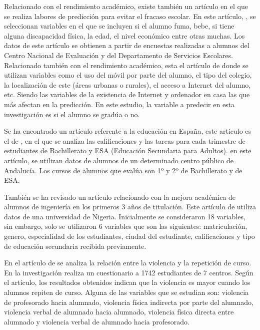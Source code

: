 Relacionado con el rendimiento académico, existe también un artículo en el que se realiza labores de predicción para evitar el fracaso escolar. En este artículo, \cite{vera2012prediccion}, se seleccionan variables en el que se incluyen si el alumno fuma, bebe, si tiene alguna discapacidad física, la edad, el nivel económico entre otras muchas. Los datos de este artículo se obtienen a partir de encuestas realizadas a alumnos del Centro Nacional de Evaluación y del Departamento de Servicios Escolares. Relacionado también con el rendimiento académico, esta el artículo de  donde se utilizan variables como el uso del móvil por parte del alumno, el tipo del colegio, la localización de este (áreas urbanas o rurales), el acceso a Internet del alumno, etc. Siendo las variables de la existencia de Internet y ordenador en casa las que más afectan en la predicción. En este estudio, la variable a predecir en esta investigación es si el alumno se gradúa o no.

Se ha encontrado un artículo referente a la educación en España, este artículo es el de , en el que se analiza las calificaciones y las tareas para cada trimestre de estudiantes de Bachillerato y ESA (Educación Secundaria para Adultos). \citeauthor{jose2016explotacion} en este artículo, se utilizan datos de alumnos de un determinado centro público de Andalucía. Los cursos de alumnos que evalúa son 1º y 2º de Bachillerato y de ESA. 

También se ha revisado un artículo relacionado con la mejora académica de alumnos de ingeniería en los primeros 3 años de titulación. Este artículo de  utiliza datos de una universidad de Nigeria. 
Inicialmente se consideraron 18 variables, sin embargo, solo se utilizaron 6 variables que son las siguientes: matriculación, genero, especialidad de los estudiantes, ciudad del estudiante, calificaciones y tipo de educación secundaria recibida previamente.

En el artículo de  se analiza la relación entre la violencia y la repetición de curso. En la investigación realiza un cuestionario a 1742 estudiantes de 7 centros. Según el artículo, los resultados obtenidos indican que la violencia es mayor cuando los alumnos repiten de curso. Alguna de las variables que se estudian son: violencia de profesorado hacia alumnado, violencia física indirecta por parte del alumnado, violencia verbal de alumnado hacia alumnado, violencia física directa entre alumnado y violencia verbal de alumnado hacia profesorado.

